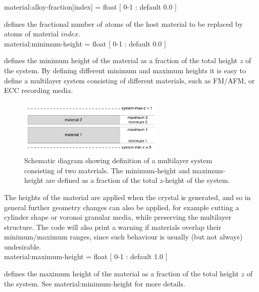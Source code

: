 
{\zicf material:alloy-fraction[index] = float [ 0-1 : default 0.0 ]} defines the fractional number of atoms of the host material to be replaced by atoms of material $index$.\\

{\zicf material:minimum-height = float [ 0-1 : default 0.0 ]} defines the minimum height of the material as a fraction of the total height $z$ of the system. By defining different minimum and maximum heights it is easy to define a multilayer system consisting of different materials, such as FM/AFM, or ECC recording media.

\begin{figure}[!h]
\center
\includegraphics[width=7cm]{figures/multilayers.pdf}
\caption{Schematic diagram showing definition of a multilayer system consisting of two materials. The minimum-height and maximum-height are defined as a fraction of the total $z$-height of the system.}
\label{fig:multilayer}
\end{figure}

The heights of the material are applied when the crystal is generated, and so in general further geometry changes can also be applied, for example cutting a cylinder shape or voronoi granular media, while preserving the multilayer structure. The code will also print a warning if materials overlap their minimum/maximum ranges, since such behaviour is usually (but not always) undesirable.\\

{\zicf material:maximum-height = float [ 0-1 : default 1.0 ]} defines the maximum height of the material as a fraction of the total height $z$ of the system. See material:minimum-height for more details.\\

